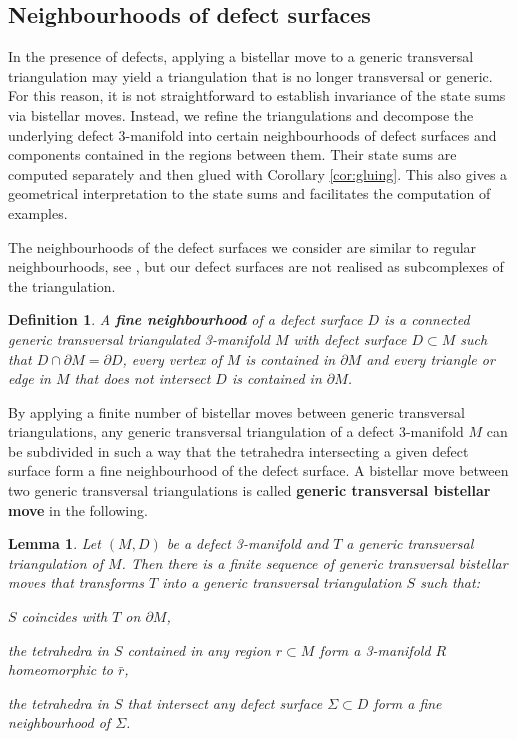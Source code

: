 \documentclass[1.5pt, a4paper]{article}
\newtheorem{lemma}[theorem]{Lemma}
\newtheorem{definition}[theorem]{Definition}
\begin{document}
\subsection{Neighbourhoods of defect surfaces}
\label{subsec:gentrans}


 In the presence of defects,  applying a bistellar move to a generic transversal triangulation may yield a triangulation that is no longer transversal or generic. 
  For this reason, it is not straightforward to establish invariance of the state sums via bistellar moves.  
  Instead, we refine the triangulations and decompose the underlying  defect 3-manifold   into certain neighbourhoods of defect surfaces and components contained in the regions between them. Their state sums are  computed separately and then  glued with Corollary \ref{cor:gluing}. This also gives a geometrical interpretation to the state sums and facilitates the computation of  examples.

The neighbourhoods of the defect surfaces we consider are similar to regular neighbourhoods, see \cite[Ch.~3]{RS}, but our defect surfaces are not realised as subcomplexes of the triangulation. 

\begin{definition} A 
 {\bf fine neighbourhood} of a defect surface $D$ is a connected
generic transversal  triangulated  3-manifold $M$ with defect surface $D\subset M$ such that
 $D\cap \partial M=\partial D$,  every vertex of $M$ is contained in $\partial M$  and every triangle or edge  in $M$ that does not intersect $D$ is contained in $\partial M$.
\end{definition}

By applying a finite number of  bistellar moves between generic transversal triangulations, any 
 generic transversal triangulation of a defect 3-manifold $M$ can be subdivided in such a way that the tetrahedra intersecting a given defect surface form a fine neighbourhood of the defect surface.  
 A bistellar move between two generic transversal triangulations is called {\bf generic transversal bistellar move} in the following. 
 



\begin{lemma} \label{lem:finetriang}Let $(M, D)$ be a defect 3-manifold  and $T$ a generic transversal  triangulation of $M$. 
Then there is a finite sequence of  generic transversal bistellar  moves  that transforms  $T$ into a generic transversal  triangulation $S$ such that:
\begin{compactenum}[(i)]
\item $S$ coincides with $T$ on $\partial M$,
\item the tetrahedra in $S$ contained in any region $r\subset M$ form a  3-manifold $R$ homeomorphic to $\bar r$,
\item the tetrahedra in $S$ that intersect any defect surface $\Sigma\subset D$ form a fine neighbourhood of $\Sigma$.
 \end{compactenum}
\end{lemma}
\end{document}
